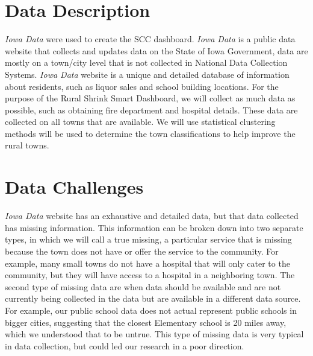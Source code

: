 \documentclass[10pt]{article}\usepackage[]{graphicx}\usepackage[]{color}
\begin{document}
\section{Data Description}
{\it Iowa Data} were used to create the SCC dashboard. {\it Iowa Data} is a public data website that collects and updates data on the State of Iowa Government, data are mostly on a town/city level that is not collected in National Data Collection Systems. {\it Iowa Data} website is a unique and detailed database of information about residents, such as liquor sales and school building locations. For the purpose of the Rural Shrink Smart Dashboard, we will collect as much data as possible, such as obtaining fire department and hospital details. These data are collected on all towns that are available. We will use statistical clustering methods will be used to determine the town classifications to help improve the rural towns.

\section{Data Challenges}
{\it Iowa Data} website has an exhaustive and detailed data, but that data collected has missing information. This information can be broken down into two separate types, in which we will call a true missing, a particular service that is missing because the town does not have or offer the service to the community. For example, many small towns do not have a hospital that will only cater to the community, but they will have access to a hospital in a neighboring town. The second type of missing data are when data should be available and are not currently being collected in the data but are available in a different data source. For example, our public school data does not actual represent public schools in bigger cities, suggesting that the closest Elementary school is 20 miles away, which we understood that to be untrue. This type of missing data is very typical in data collection, but could led our research in a poor direction.
\end{document}
